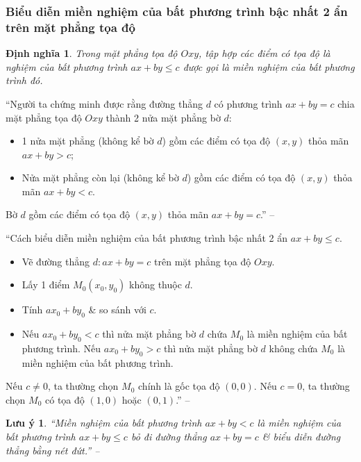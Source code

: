 \documentclass{article}
\numberwithin{equation}{section}
\newtheorem{definition}{Định nghĩa}[section]
\newtheorem{remark}{Lưu ý}[section]
\begin{document}
\subsubsection{Biểu diễn miền nghiệm của bất phương trình bậc nhất 2 ẩn trên mặt phẳng tọa độ}

\begin{definition}
	Trong mặt phẳng tọa độ $Oxy$, tập hợp các điểm có tọa độ là nghiệm của bất phương trình $ax + by\le c$ được gọi là \emph{miền nghiệm} của bất phương trình đó.
\end{definition}
``Người ta chứng minh được rằng đường thẳng $d$ có phương trình $ax + by = c$ chia mặt phẳng tọa độ $Oxy$ thành 2 nửa mặt phẳng bờ $d$:
\begin{itemize}
	\item 1 nửa mặt phẳng (không kể bờ $d$) gồm các điểm có tọa độ $(x,y)$ thỏa mãn $ax + by > c$;
	\item Nửa mặt phẳng còn lại (không kể bờ $d$) gồm các điểm có tọa độ $(x,y)$ thỏa mãn $ax + by < c$.
\end{itemize}
Bờ $d$ gồm các điểm có tọa độ $(x,y)$ thỏa mãn $ax + by = c$.'' -- \cite[p. 24]{Khoai_Anh_Tan_Thang_Anh_Cuong_Duong_Dang_Ha_Hanh_Hong_Son_Tuan_Vuong_Toan_10_tap_1}

``Cách biểu diễn miền nghiệm của bất phương trình bậc nhất 2 ẩn $ax + by\le c$.
\begin{itemize}
	\item Vẽ đường thẳng $d:ax + by = c$ trên mặt phẳng tọa độ $Oxy$.
	\item Lấy 1 điểm $M_0(x_0,y_0)$ không thuộc $d$.
	\item Tính $ax_0 + by_0$ \& so sánh với $c$.
	\item Nếu $ax_0 + by_0 < c$ thì nửa mặt phẳng bờ $d$ chứa $M_0$ là miền nghiệm của bất phương trình. Nếu $ax_0 + by_0 > c$ thì nửa mặt phẳng bờ $d$ không chứa $M_0$ là miền nghiệm của bất phương trình.
\end{itemize}
Nếu $c\ne 0$, ta thường chọn $M_0$ chính là gốc tọa độ $(0,0)$. Nếu $c = 0$, ta thường chọn $M_0$ có tọa độ $(1,0)$ hoặc $(0,1)$.'' -- \cite[p. 24]{Khoai_Anh_Tan_Thang_Anh_Cuong_Duong_Dang_Ha_Hanh_Hong_Son_Tuan_Vuong_Toan_10_tap_1}

\begin{remark}
	``Miền nghiệm của bất phương trình $ax + by < c$ là miền nghiệm của bất phương trình $ax + by\le c$ bỏ đi đường thẳng $ax + by = c$ \& biểu diễn đường thẳng bằng nét đứt.'' -- \cite[p. 24]{Khoai_Anh_Tan_Thang_Anh_Cuong_Duong_Dang_Ha_Hanh_Hong_Son_Tuan_Vuong_Toan_10_tap_1}
\end{remark}
\end{document}
